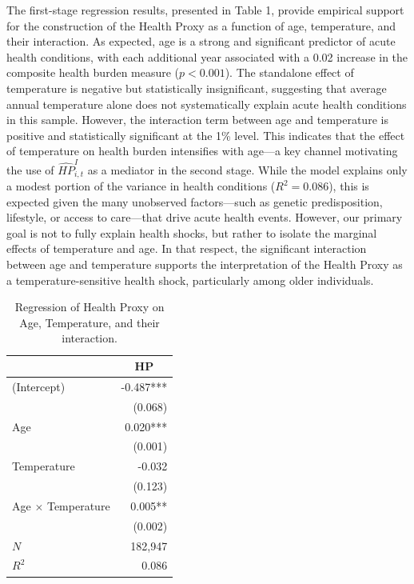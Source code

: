 \documentclass{article}
\begin{document}
The first-stage regression results, presented in Table 1, provide empirical support for the construction of the Health Proxy as a function of age, temperature, and their interaction.
As expected, age is a strong and significant predictor of acute health conditions, with each additional year associated with a 0.02 increase in the composite health burden measure ($p < 0.001$).
The standalone effect of temperature is negative but statistically insignificant, suggesting that average annual temperature alone does not systematically explain acute health conditions in this sample.
However, the interaction term between age and temperature is positive and statistically significant at the 1\% level.
This indicates that the effect of temperature on health burden intensifies with age—a key channel motivating the use of $\widehat{HP}_{i,t}^I$ as a mediator in the second stage.
While the model explains only a modest portion of the variance in health conditions ($R^2 = 0.086$), this is expected given the many unobserved factors—such as genetic predisposition, lifestyle, or access to care—that drive acute health events. However, our primary goal is not to fully explain health shocks, but rather to isolate the marginal effects of temperature and age. In that respect, the significant interaction between age and temperature supports the interpretation of the Health Proxy as a temperature-sensitive health shock, particularly among older individuals.

\begin{table}[H]
    \begin{center}
        \begin{tabular}{lr}
            \toprule
                                    & \multicolumn{1}{c}{HP} \\ 
            \midrule
            (Intercept)              &              -0.487*** \\ 
                                    &                (0.068) \\ 
            Age                      &               0.020*** \\ 
                                    &                (0.001) \\ 
            Temperature              &                 -0.032 \\ 
                                    &                (0.123) \\ 
            Age $\times$ Temperature &                0.005** \\ 
                                    &                (0.002) \\ 
            \midrule
            $N$                      &                182,947 \\ 
            $R^2$                    &                  0.086 \\ 
            \bottomrule
        \end{tabular}
        \caption{Regression of Health Proxy on Age, Temperature, and their interaction.}
    \end{center}
\end{table}
\end{document}
